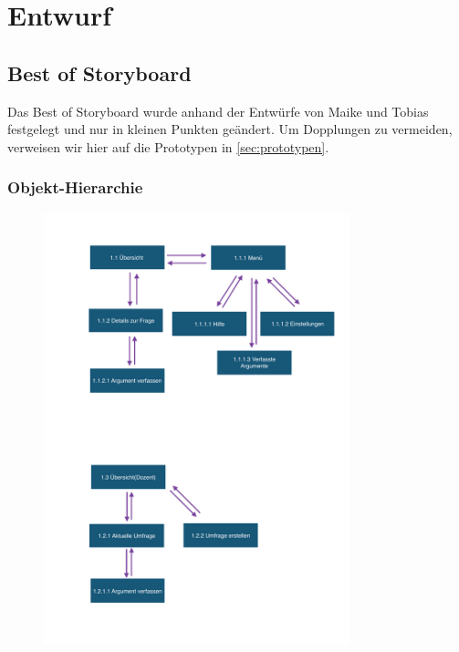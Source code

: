 \chapter{Entwurf}
\label{chap:entwurf}




\clearpage



\clearpage



\clearpage

\section{Best of Storyboard}
\label{sec:bestof}

Das Best of Storyboard wurde anhand der Entwürfe von Maike und Tobias festgelegt und nur in kleinen Punkten geändert. Um Dopplungen zu vermeiden, verweisen wir hier auf die Prototypen in \ref{sec:prototypen}.

\subsection{Objekt-Hierarchie}
\label{sec:objekthierarchie}

\begin{figure}
  \vspace{-20pt}
  \begin{center}
    \includegraphics[page=1,width=0.79\textwidth]{./images/objekthierachie}
  \end{center}
  \vspace{-40pt}
\end{figure}

